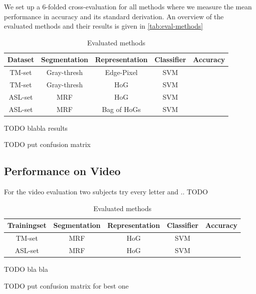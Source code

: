 \documentclass[letterpaper, 10 pt, conference]{ieeeconf}  %
\begin{document}
We set up a 6-folded cross-evaluation for all methods where we measure the mean performance in accuracy and its standard derivation. An overview of the evaluated methods and their results is given in \autoref{tab:eval-methods}

\begin{table}[h]
\caption{Evaluated methods}
\label{tab:eval-methods}
\begin{center}
\begin{tabular}{c|c|c|c|c}
Dataset & Segmentation & Representation & Classifier & Accuracy \\
\hline
\hline
TM-set & Gray-thresh & Edge-Pixel & SVM &\\
TM-set & Gray-thresh & HoG & SVM &\\
ASL-set & MRF & HoG & SVM &\\
ASL-set & MRF & Bag of HoGs & SVM & \\
\hline
\end{tabular}
\end{center}
\end{table}

TODO blabla results

TODO put confusion matrix

\subsection{Performance on Video}

For the video evaluation two subjects try every letter and .. TODO

\begin{table}[h]
\caption{Evaluated methods}
\label{tab:eval-methods}
\begin{center}
\begin{tabular}{c|c|c|c|c}
Trainingset & Segmentation & Representation & Classifier & Accuracy \\
\hline
\hline
TM-set & MRF & HoG & SVM &\\
ASL-set & MRF & HoG & SVM &\\
\hline
\end{tabular}
\end{center}
\end{table}

TODO bla bla

TODO put confusion matrix for best one
\end{document}
